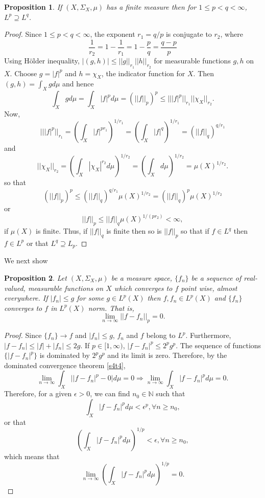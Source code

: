 \documentclass{article}
\newcommand{\son}{\mathbb{N}}
\theoremstyle{plain}
\numberwithin{thm}{section}
\theoremstyle{plain}
\newtheorem{prop}{Proposition}
\numberwithin{prop}{section}
\theoremstyle{definition}
\numberwithin{defn}{section}
\theoremstyle{remark}
\theoremstyle{plain}
\numberwithin{cor}{section}
\numberwithin{equation}{section}
\begin{document}
\begin{prop}\label{s5p5}
If $(X, \Sigma_X, \mu)$ has a finite measure then for $1 \le p < q < \infty$,
$L^p \supseteq L^q$.
\end{prop}
\begin{proof}
Since $1 \le p < q < \infty$, the exponent $r_1 = q/p$ is conjugate to $r_2$,
where
\[
\frac{1}{r_2} = 1 - \frac{1}{r_1} = 1 - \frac{p}{q} = \frac{q-p}{p}
\]
Using H\"{o}lder inequality, $|(g, h)| \le ||g||_{r_1}||h||_{r_2}$ for 
measurable functions $g, h$ on $X$. Choose $g = |f|^p$ and $h = \chi_X$, the
indicator function for $X$. Then $(g, h) = \int_X g d\mu$ and hence
\begin{equation}
\int_X g d\mu = \int_X |f|^p d\mu = (||f||_p)^p \le 
|| |f|^p ||_{r_1} || \chi_X ||_{r_2}.
\end{equation}
Now,
\[
|| |f|^p ||_{r_1} = \left(\int_X |f|^{pr_1}\right)^{1/r_1} = 
\left(\int_X |f|^q\right)^{1/r_1} = (|| f ||_q)^{q/r_1}
\]
and
\[
||\chi_X||_{r_2} = \left(\int_X |\chi_X|^{r_2} d\mu\right)^{1/r_2} = 
\left(\int_X d\mu\right)^{1/r_2} = \mu(X)^{1/r_2}.
\]
so that
\[
(||f||_p)^p \le (|| f ||_q)^{q/r_1}\mu(X)^{1/r_2} = 
(|| f ||_q)^p\mu(X)^{1/r_2}
\]
or
\[
||f||_p \le ||f||_q \mu(X)^{1/(pr_2)} < \infty,
\]
if $\mu(X)$ is finite. Thus, if $||f||_q$ is finite then so is $||f||_p$ so that
if $f \in L^q$ then $f \in L^p$ or that $L^q \supseteq L_p$.
\end{proof}

We next show 
\begin{prop}\label{s5p6}
Let $(X, \Sigma_X, \mu)$ be a measure space, $\{f_n\}$ be a sequence of 
real-valued, measurable functions on $X$ which converges to $f$ point wise,
almost everywhere. If $|f_n| \le g$ for some $g \in L^p(X)$ then $f, f_n \in
L^p(X)$ and $\{f_n\}$ converges to $f$ in $L^p(X)$ norm. That is,
\[
\lim_{n \rightarrow \infty}||f - f_n||_p = 0.
\]
\end{prop}
\begin{proof}
Since $\{f_n\} \rightarrow f$ and $|f_n| \le g$, $f_n$ and $f$ belong to $L^p$.
Furthermore, $|f - f_n| \le |f| + |f_n| \le 2g$. If $p \in [1, \infty)$, 
$|f - f_n|^p \le 2^p g^p$. The sequence of functions $\{|f - f_n|^p\}$ is 
dominated by $2^p g^p$ and its limit is zero. Therefore, by the dominated 
convergence theorem \ref{s4t4},
\[
\lim_{n \rightarrow \infty}\int_X \Big||f - f_n|^p - 0\Big| d\mu = 0
\Rightarrow
\lim_{n \rightarrow \infty}\int_X|f - f_n|^p d\mu = 0.
\]
Therefore, for a given $\epsilon > 0$, we can find $n_0 \in \son$ such that
\[
\int_X|f - f_n|^p d\mu < \epsilon^p, \forall n \ge n_0,
\]
or that
\[
\left(\int_X|f - f_n|^p d\mu\right)^{1/p} < \epsilon, \forall n \ge n_0,
\]
which means that
\[
\lim_{n \rightarrow \infty}\left(\int_X |f - f_n|^p d\mu\right)^{1/p} = 0.
\]
\end{proof}
\end{document}
